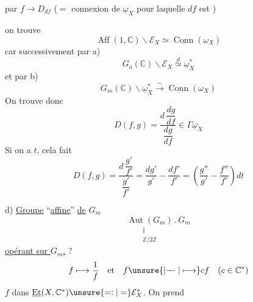 par $f\longrightarrow D_{df}$ ($=$ connexion de $\underline\omega_X$
pour laquelle  $df$ est
)

on trouve
\[
\operatorname{Aff}(1,\mathbb C)\backslash \mathcal E_X
\simeq\underline{\operatorname{Conn}}(\omega_X)
\]
car successivement par a)
\[
G_a(\mathbb C)\backslash \mathcal E_X\overset{d}{\simeq}\underline\omega_X^*
\]
et par b)
\[
G_m(\mathbb C)\backslash\underline\omega_X^*
\overset{\sim}{\longrightarrow}\underline{\operatorname{Conn}}(\omega_X)
\]
On trouve donc
\[
D(f,g)=\frac{d\,\dfrac{dg}{df}}{\dfrac{dg}{df}}
\in\Gamma\underline\omega_X
\]
Si on a  $t$, cela fait
\[
D(f,g)=\frac{d\,\dfrac{g'}{f'}}{\dfrac{g'}{f'}}
=\frac{dg'}{g'}-\frac{df'}{f'}
=\left(\frac{g''}{g'}-\frac{f''}{f'}\right)dt
\]


d)  \uline{Groupe} ``\uline{affine}'' \uline{de} $G_m$
\[
\underset{\substack{\Vert\\\mathbb Z/2\mathbb Z}}{\operatorname{Aut}(G_m)}
\mathbin{.}G_m
\]
\uline{opérant sur $G_m$.} ?
\[
f\longmapsto\frac1f\quad\text{et}\quad
f\unsure{\mathrel{\mid\!\!-\!\!-}|\longmapsto}cf
\quad(c\in\mathbb C^*)
\]
$f$ dans $\underline{\operatorname{Et}}(X,\mathbb C^*)
\unsure{\mathrel{=:}|=}\mathcal E_X^*$. On prend

